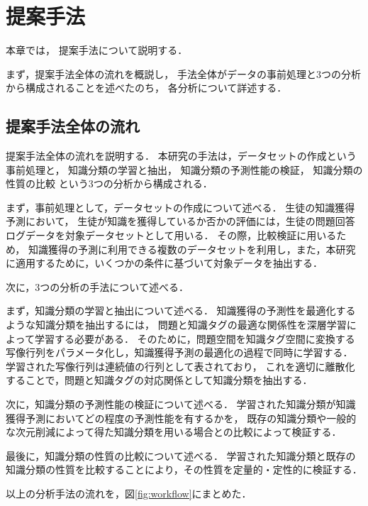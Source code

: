 \chapter{提案手法}
\label{chap:method}
\fancyhf{}
\rhead{\thepage}
\cfoot{\thepage}
本章では，
提案手法について説明する．

まず，提案手法全体の流れを概説し，
手法全体がデータの事前処理と3つの分析から構成されることを述べたのち，
各分析について詳述する．

\vvspace


\section{提案手法全体の流れ}
提案手法全体の流れを説明する．
本研究の手法は，データセットの作成という事前処理と，
知識分類の学習と抽出，
知識分類の予測性能の検証，
知識分類の性質の比較
という3つの分析から構成される．


まず，事前処理として，データセットの作成について述べる．
生徒の知識獲得予測において，
生徒が知識を獲得しているか否かの評価には，生徒の問題回答ログデータを対象データセットとして用いる．
その際，比較検証に用いるため，
知識獲得の予測に利用できる複数のデータセットを利用し，また，本研究に適用するために，いくつかの条件に基づいて対象データを抽出する．


次に，3つの分析の手法について述べる．

まず，知識分類の学習と抽出について述べる．
知識獲得の予測性を最適化するような知識分類を抽出するには，
問題と知識タグの最適な関係性を深層学習によって学習する必要がある．
そのために，問題空間を知識タグ空間に変換する写像行列をパラメータ化し，知識獲得予測の最適化の過程で同時に学習する．
学習された写像行列は連続値の行列として表されており，
これを適切に離散化することで，問題と知識タグの対応関係として知識分類を抽出する．

次に，知識分類の予測性能の検証について述べる．
学習された知識分類が知識獲得予測においてどの程度の予測性能を有するかを，
既存の知識分類や一般的な次元削減によって得た知識分類を用いる場合との比較によって検証する．

最後に，知識分類の性質の比較について述べる．
学習された知識分類と既存の知識分類の性質を比較することにより，その性質を定量的・定性的に検証する．

以上の分析手法の流れを，図\ref{fig:workflow}にまとめた．

